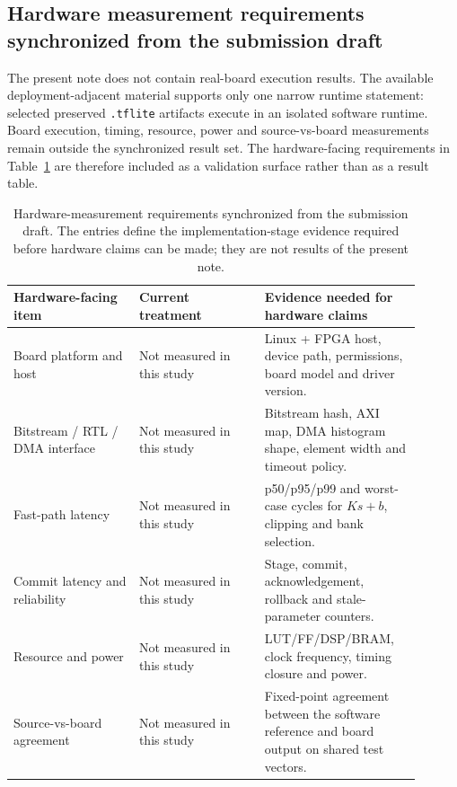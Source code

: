 \documentclass[11pt]{article}
\begin{document}
\subsection{Hardware measurement requirements synchronized from the submission draft}

The present note does not contain real-board execution results.  The available
deployment-adjacent material supports only one narrow runtime statement:
selected preserved \texttt{.tflite} artifacts execute in an isolated software
runtime.  Board execution, timing, resource, power and source-vs-board
measurements remain outside the synchronized result set.  The hardware-facing
requirements in Table~\ref{tab:hardware-plan-note} are therefore included as a
validation surface rather than as a result table.

\begin{table}[ht]
\centering
\scriptsize
\setlength{\tabcolsep}{2.5pt}
\begin{tabular}{>{\raggedright\arraybackslash}p{0.28\linewidth}
                >{\raggedright\arraybackslash}p{0.28\linewidth}
                >{\raggedright\arraybackslash}p{0.34\linewidth}}
\toprule
Hardware-facing item & Current treatment & Evidence needed for hardware claims \\
\midrule
Board platform and host & Not measured in this study & Linux + FPGA host,
device path, permissions, board model and driver version. \\
\addlinespace
Bitstream / RTL / DMA interface & Not measured in this study & Bitstream
hash, AXI map, DMA histogram shape, element width and timeout policy. \\
\addlinespace
Fast-path latency & Not measured in this study & p50/p95/p99 and worst-case
cycles for \(Ks+b\), clipping and bank selection. \\
\addlinespace
Commit latency and reliability & Not measured in this study & Stage, commit,
acknowledgement, rollback and stale-parameter counters. \\
\addlinespace
Resource and power & Not measured in this study & LUT/FF/DSP/BRAM, clock
frequency, timing closure and power. \\
\addlinespace
Source-vs-board agreement & Not measured in this study & Fixed-point
agreement between the software reference and board output on shared test
vectors. \\
\bottomrule
\end{tabular}
\caption{Hardware-measurement requirements synchronized from the submission
draft.  The entries define the implementation-stage evidence required before
hardware claims can be made; they are not results of the present note.}
\label{tab:hardware-plan-note}
\end{table}
\end{document}
